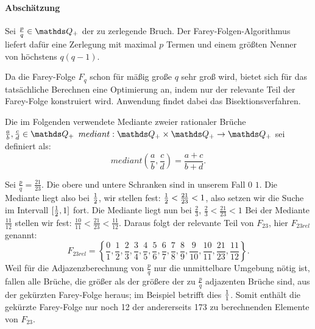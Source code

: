 \paragraph{Abschätzung}Sei $\frac{p}{q} \in \Q_+$ der zu zerlegende Bruch. Der Farey-Folgen-Algorithmus liefert dafür eine Zerlegung mit maximal $p$ Termen und einem größten Nenner von höchstens $q(q-1)$. \cite[S.343]{Bleicher1972}

Da die Farey-Folge $F_q$ schon für mäßig große $q$ sehr groß wird, bietet sich für das tatsächliche Berechnen eine Optimierung an, indem nur der relevante Teil der Farey-Folge konstruiert wird. Anwendung findet dabei das Bisektionsverfahren.
\begin{def1}\label{def:mediant}
	Die im Folgenden verwendete Mediante zweier rationaler Brüche $\frac{a}{b}, \frac{c}{d} \in \Q_+$ $mediant: \Q_+ \times \Q_+ \rightarrow \Q_+$ sei definiert als:
	$$mediant \left(\frac{a}{b}, \frac{c}{d}\right) = \frac{a+c}{b+d}.$$
\end{def1}
\begin{bsp}\label{bsp:Frel}
	Sei $\frac{p}{q} = \frac{21}{23}$. Die obere und untere Schranken sind in unserem Fall $0$ \bzw $1$. Die Mediante liegt also bei $\frac{1}{2}$, wir stellen fest: $\frac{1}{2}<\frac{21}{23}<1$, also setzen wir die Suche im Intervall $[\frac{1}{2}, 1]$ fort. Die Mediante liegt nun bei $\frac{2}{3}$, $\frac{2}{3}<\frac{21}{23}<1$ \usw
	Bei der Mediante $\frac{11}{12}$ stellen wir fest: $\frac{10}{11} < \frac{21}{23} < \frac{11}{12}.$ Daraus folgt der relevante Teil von $F_{23}$, hier $F_{23rel}$ genannt: $$F_{23rel} = \left\{\frac{0}{1}, \frac{1}{2}, \frac{2}{3}, \frac{3}{4}, \frac{4}{5}, \frac{5}{6}, \frac{6}{7}, \frac{7}{8}, \frac{8}{9}, \frac{9}{10}, \frac{10}{11}, \frac{21}{23}, \frac{11}{12}\right\}.$$
	Weil für die Adjazenzberechnung von $\frac{p}{q}$ nur die unmittelbare Umgebung nötig ist, fallen alle Brüche, die größer als der größere der zu $\frac{p}{q}$ adjazenten Brüche sind, aus der gekürzten Farey-Folge heraus; im Beispiel betrifft dies $\frac{1}{1}$.
	Somit enthält die gekürzte Farey-Folge nur noch 12 der andererseits 173 zu berechnenden Elemente von $F_{23}$.
\end{bsp}